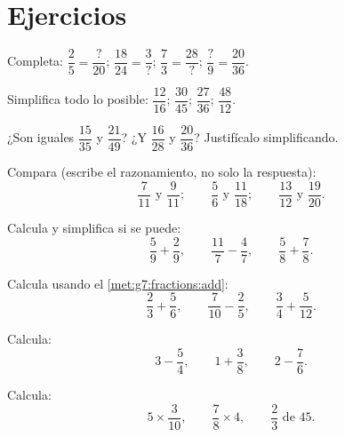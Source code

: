 \section{Ejercicios}

\begin{exercise}[$\star$]\label{exo:g7:fractions:1}
Completa: $\dfrac{2}{5} = \dfrac{?}{20}$; \quad
$\dfrac{18}{24} = \dfrac{3}{?}$; \quad
$\dfrac{7}{3} = \dfrac{28}{?}$; \quad
$\dfrac{?}{9} = \dfrac{20}{36}$.
\end{exercise}

\begin{exercise}[$\star$]\label{exo:g7:fractions:2}
Simplifica todo lo posible:
$\dfrac{12}{16}$; \quad $\dfrac{30}{45}$; \quad $\dfrac{27}{36}$;
\quad $\dfrac{48}{12}$.
\end{exercise}

\begin{exercise}[$\star$]\label{exo:g7:fractions:3}
¿Son iguales $\dfrac{15}{35}$ y $\dfrac{21}{49}$? ¿Y $\dfrac{16}{28}$
y $\dfrac{20}{36}$? Justifícalo simplificando.
\end{exercise}

\begin{exercise}[$\star$]\label{exo:g7:fractions:4}
Compara (escribe el razonamiento, no solo la respuesta):
\[
\frac{7}{11} \text{ y } \frac{9}{11}; \qquad
\frac{5}{6} \text{ y } \frac{11}{18}; \qquad
\frac{13}{12} \text{ y } \frac{19}{20}.
\]
\end{exercise}

\begin{exercise}[$\star$]\label{exo:g7:fractions:5}
Calcula y simplifica si se puede:
\[
\frac{5}{9} + \frac{2}{9}, \qquad
\frac{11}{7} - \frac{4}{7}, \qquad
\frac{5}{8} + \frac{7}{8} .
\]
\end{exercise}

\begin{exercise}[$\star$]\label{exo:g7:fractions:6}
Calcula usando el \cref{met:g7:fractions:add}:
\[
\frac{2}{3} + \frac{5}{6}, \qquad
\frac{7}{10} - \frac{2}{5}, \qquad
\frac{3}{4} + \frac{5}{12} .
\]
\end{exercise}

\begin{exercise}[$\star$]\label{exo:g7:fractions:7}
Calcula:
\[
3 - \frac{5}{4}, \qquad
1 + \frac{3}{8}, \qquad
2 - \frac{7}{6} .
\]
\end{exercise}

\begin{exercise}[$\star$]\label{exo:g7:fractions:8}
Calcula:
\[
5 \times \frac{3}{10}, \qquad
\frac{7}{8} \times 4, \qquad
\frac{2}{3} \text{ de } 45 .
\]
\end{exercise}

